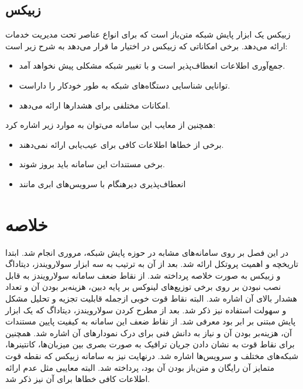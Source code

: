 \subsection{زبیکس}

زبیکس یک ابزار پایش شبکه متن‌باز است که برای انواع عناصر تحت مدیریت خدمات ارائه می‌دهد. برخی امکاناتی که زبیکس در اختیار ما قرار می‌دهد به شرح زیر است\cite{olups2010zabbix}:

\begin{itemize}
    \item جمع‌آوری اطلاعات انعطاف‌پذیر است و با تغییر شبکه مشکلی پیش نخواهد آمد.
    \item توانایی شناسایی دستگاه‌های شبکه به طور خودکار را داراست.
    \item امکانات مختلفی برای هشدارها ارائه می‌دهد.
\end{itemize}
\newpage
همچنین از معایب این سامانه می‌توان به موارد زیر اشاره کرد:

\begin{itemize}
    \item برخی از خطاها اطلاعات کافی برای عیب‌یابی ارائه نمی‌دهند.
    \item برخی مستندات این سامانه باید بروز شوند.
    \item انعطاف‌پذیری دیرهنگام با سرویس‌های ابری مانند 
\end{itemize}

\section{خلاصه}

در این فصل بر روی سامانه‌های مشابه در حوزه پایش شبکه، مروری انجام شد. ابتدا تاریخچه‌ و اهمیت پروتکل  ارائه شد. بعد از آن به ترتیب به سه ابزار سولارویندز، دیتاداگ و زبیکس به صورت خلاصه پرداخته شد. از نقاط ضعف سامانه سولارویندز به قابل نصب نبودن بر روی برخی توزیع‌های لینوکس بر پایه دبین، هزینه‌بر بودن آن و تعداد هشدار بالای آن اشاره شد. البته نقاط قوت خوبی ازجمله قابلیت تجزیه و تحلیل مشکل و سهولت استفاده نیز ذکر شد. بعد از مطرح کردن سولارویندز، دیتاداگ که یک ابزار پایش مبتنی بر ابر بود معرفی شد. از نقاط ضعف این سامانه به کیفیت پایین مستندات آن، هزینه‌بر بودن آن و نیاز به دانش فنی برای درک نمودارهای آن اشاره شد. همچنین برای نقاط قوت به نشان دادن جریان ترافیک به صورت بصری بین میزبان‌ها، کانتینرها، شبکه‌های مختلف و سرویس‌ها اشاره شد. درنهایت نیز به سامانه زبیکس که نقطه قوت متمایز آن رایگان و متن‌باز بودن آن بود، پرداخته شد. البته معایبی مثل عدم ارائه اطلاعات کافی خطاها برای آن نیز ذکر شد.
